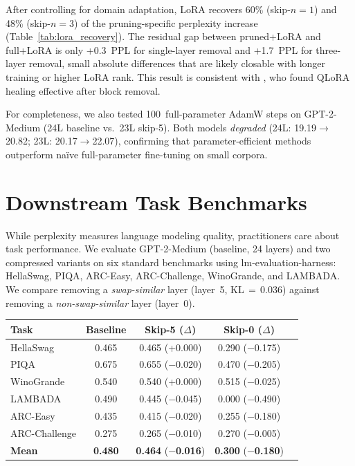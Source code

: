 \documentclass{article}
\newenvironment{tabhere}{%
  \par\medskip
  \begin{center}
}{%
  \end{center}
  \medskip
}
\begin{document}
After controlling for domain adaptation, LoRA recovers 60\% (skip-$n{=}1$) and 48\% (skip-$n{=}3$) of the pruning-specific perplexity increase (Table~\ref{tab:lora_recovery}).
The residual gap between pruned+LoRA and full+LoRA is only +0.3~PPL for single-layer removal and +1.7~PPL for three-layer removal, small absolute differences that are likely closable with longer training or higher LoRA rank.
This result is consistent with \citet{gromov2024unreasonable}, who found QLoRA healing effective after block removal.

For completeness, we also tested 100~full-parameter AdamW steps on GPT-2-Medium (24L baseline vs.\ 23L skip-5).
Both models \emph{degraded} (24L: 19.19$\to$20.82; 23L: 20.17$\to$22.07), confirming that parameter-efficient methods outperform na\"ive full-parameter fine-tuning on small corpora.

\section{Downstream Task Benchmarks}
\label{sec:exp_downstream}
\label{sec:app_downstream}

While perplexity measures language modeling quality, practitioners care about task performance. We evaluate GPT-2-Medium (baseline, 24 layers) and two compressed variants on six standard benchmarks using lm-evaluation-harness: HellaSwag, PIQA, ARC-Easy, ARC-Challenge, WinoGrande, and LAMBADA. We compare removing a \emph{swap-similar} layer (layer~5, KL\,$=$\,0.036) against removing a \emph{non-swap-similar} layer (layer~0).

\begin{tabhere}
\begin{tabular}{lcccc}
\toprule
Task & Baseline & Skip-5 ($\Delta$) & Skip-0 ($\Delta$) \\
\midrule
HellaSwag & 0.465 & 0.465 (+0.000) & 0.290 ($-$0.175) \\
PIQA & 0.675 & 0.655 ($-$0.020) & 0.470 ($-$0.205) \\
WinoGrande & 0.540 & 0.540 (+0.000) & 0.515 ($-$0.025) \\
LAMBADA & 0.490 & 0.445 ($-$0.045) & 0.000 ($-$0.490) \\
ARC-Easy & 0.435 & 0.415 ($-$0.020) & 0.255 ($-$0.180) \\
ARC-Challenge & 0.275 & 0.265 ($-$0.010) & 0.270 ($-$0.005) \\
\midrule
\textbf{Mean} & \textbf{0.480} & \textbf{0.464} ($-$\textbf{0.016}) & \textbf{0.300} ($-$\textbf{0.180}) \\
\bottomrule
\end{tabular}
\label{tab:downstream}
\end{tabhere}
\end{document}
